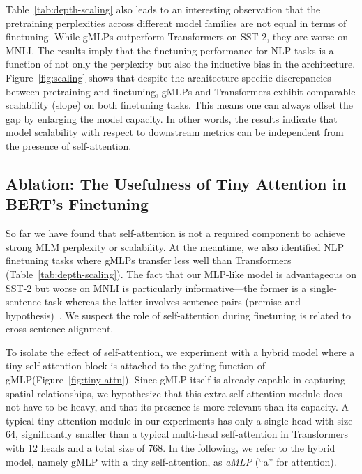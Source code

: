 \documentclass{article}
\newcommand{\gffn}{gMLP\xspace}
\begin{document}
Table~\ref{tab:depth-scaling} also leads to an interesting observation that the pretraining perplexities across different model families are not equal in terms of finetuning.
While
\gffn{s} outperform Transformers on SST-2,
they are worse on MNLI. The results imply that the finetuning performance for NLP tasks is a function of not only the perplexity but also the inductive bias in the architecture.
Figure~\ref{fig:scaling} shows that despite the architecture-specific discrepancies between pretraining and finetuning,
\gffn{s} and Transformers exhibit comparable scalability (slope) on both finetuning tasks. This means one can always offset the gap by enlarging the model capacity.
In other words,
the results indicate that model scalability with respect to downstream metrics can be independent from the presence of self-attention.

\subsection{Ablation: The Usefulness of Tiny Attention in BERT's Finetuning}
So far we have
found that self-attention is not a required component to achieve strong MLM perplexity or scalability.
At the meantime,
we also identified NLP finetuning tasks where \gffn{s} transfer less well than Transformers (Table~\ref{tab:depth-scaling}). The fact that our MLP-like model is advantageous on SST-2 but worse on MNLI is particularly informative---the former is a single-sentence task whereas the latter involves sentence pairs (premise and hypothesis)~\cite{williams2017broad}.
We suspect the role of self-attention during finetuning is related to cross-sentence alignment.

To isolate the effect of self-attention,
we experiment with a hybrid model where a tiny self-attention block is attached to the gating function of \gffn (Figure~\ref{fig:tiny-attn}).
Since \gffn itself is already capable in capturing spatial relationships,
we hypothesize that this extra self-attention module does not have to be heavy, and that its presence is more relevant than its capacity.
A typical tiny attention module in our experiments has only a single head with size 64,
significantly smaller than a typical multi-head self-attention in Transformers with 12 heads and a total size of 768.
In the following,
we refer to the hybrid model, namely gMLP with a tiny self-attention, as \emph{aMLP} (``a'' for attention).
\end{document}

